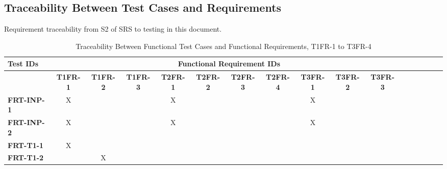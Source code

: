 \documentclass[12pt, titlepage]{article}
\begin{document}
\begin{landscape}

		\subsection{Traceability Between Test Cases and Requirements}

		Requirement traceability from S2 of SRS to testing in this document.

		\begin{longtable}{|l|cccccccccccccccc|}
			\caption{Traceability Between Functional Test Cases and Functional Requirements, T1FR-1 to T3FR-4}                                                                                                                                                                                                                           \\
			\hline
			\textbf{Test IDs}   & \multicolumn{11}{c|}{\textbf{Functional Requirement IDs}}                                                                                                                                                                                                                                         \\
			\hline
			~                   & \textbf{T1FR-1}                                              & \textbf{T1FR-2} & \textbf{T1FR-3} & \textbf{T2FR-1} & \textbf{T2FR-2} & \textbf{T2FR-3} & \textbf{T2FR-4} & \textbf{T3FR-1} & \textbf{T3FR-2} & \textbf{T3FR-3}  \\
			\hline
   		\textbf{FRT-INP-1}  & X                                                         & ~            & ~            & X            & ~            & ~            & ~            & X            & ~            & ~             \\
        	\textbf{FRT-INP-2}  & X                                                         & ~            & ~            & X            & ~            & ~            & ~            & X            & ~            & ~             \\
          \textbf{FRT-T1-1}  & X                                                         & ~            & ~            & ~            & ~            & ~            & ~            & ~            & ~            & ~             \\
          \textbf{FRT-T1-2}  & ~                                                         & X            & ~            & ~            & ~            & ~            & ~            & ~            & ~            & ~             \\

\end{longtable}
\end{landscape}
\end{document}
